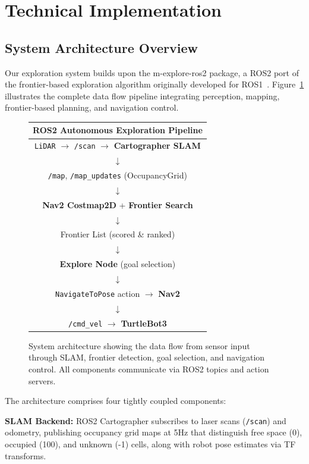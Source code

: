 \documentclass[conference]{IEEEtran}
\begin{document}
\section{Technical Implementation}

\subsection{System Architecture Overview}

Our exploration system builds upon the m-explore-ros2 package, a ROS2 port of the frontier-based exploration algorithm originally developed for ROS1~\cite{horner2016exploration}. Figure~\ref{fig:architecture} illustrates the complete data flow pipeline integrating perception, mapping, frontier-based planning, and navigation control.

\begin{figure}[h]
\centering
\small
\begin{tabular}{c}
\textbf{ROS2 Autonomous Exploration Pipeline} \\[0.5em]
\hline
\texttt{LiDAR} $\rightarrow$ \texttt{/scan} $\rightarrow$ \textbf{Cartographer SLAM} \\
$\downarrow$ \\
\texttt{/map}, \texttt{/map\_updates} (OccupancyGrid) \\
$\downarrow$ \\
\textbf{Nav2 Costmap2D} + \textbf{Frontier Search} \\
$\downarrow$ \\
Frontier List (scored \& ranked) \\
$\downarrow$ \\
\textbf{Explore Node} (goal selection) \\
$\downarrow$ \\
\texttt{NavigateToPose} action $\rightarrow$ \textbf{Nav2} \\
$\downarrow$ \\
\texttt{/cmd\_vel} $\rightarrow$ \textbf{TurtleBot3} \\
\hline
\end{tabular}
\caption{System architecture showing the data flow from sensor input through SLAM, frontier detection, goal selection, and navigation control. All components communicate via ROS2 topics and action servers.}
\label{fig:architecture}
\end{figure}

The architecture comprises four tightly coupled components:

\textbf{SLAM Backend:} ROS2 Cartographer subscribes to laser scans (\texttt{/scan}) and odometry, publishing occupancy grid maps at 5Hz that distinguish free space (0), occupied (100), and unknown (-1) cells, along with robot pose estimates via TF transforms.
\end{document}
